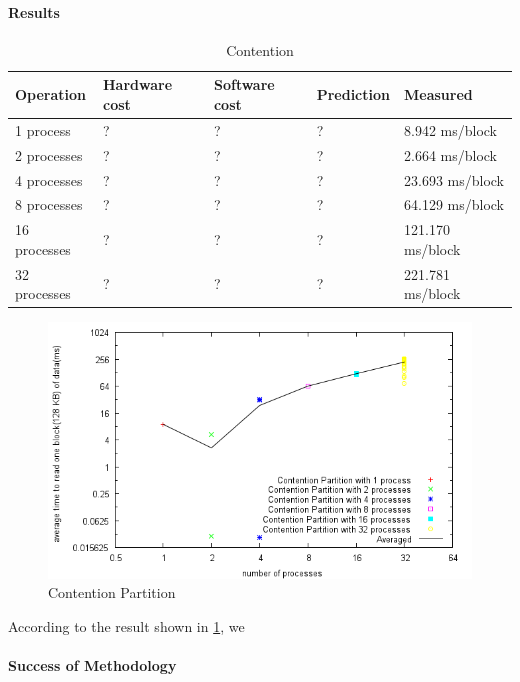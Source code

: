 \paragraph{Results}
\begin{table}
\begin{center}
\begin{tabular}{| l | l | l | l | l |}
\hline
Operation & Hardware cost & Software cost & Prediction & Measured \\
\hline
1 process		& ?		& ?       & ?        & 8.942    ms/block \\ \hline
2 processes	& ?		& ?       & ?        & 2.664    ms/block \\ \hline
4 processes	& ?		& ?       & ?        & 23.693    ms/block \\ \hline
8 processes	& ?		& ?       & ?        & 64.129    ms/block \\ \hline
16 processes	& ?		& ?       & ?        & 121.170    ms/block \\ \hline
32 processes	& ?		& ?       & ?        & 221.781    ms/block \\ \hline



\end{tabular}
\end{center}
\caption{Contention\label{tab:contention}}
\end{table}



\begin{figure}[h]
\begin{center}
\includegraphics[scale=0.8]{contentionPartitionImage}
\end{center}
\caption {Contention Partition\label{fig:contention-partition}}

\end{figure}




According to the result shown in \ref{tab:contention}, we

\paragraph{Success of Methodology}


